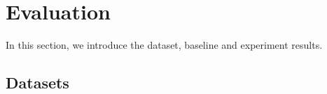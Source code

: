 \section{Evaluation}
\label{sec:eval}
In this section, we introduce the dataset, 
baseline and experiment results.


\subsection{Datasets}
%

